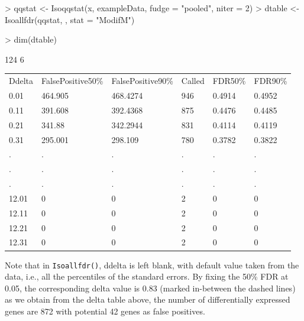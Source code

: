 \documentclass[10pt]{mybook4}
\begin{document}
\begin{Schunk}
\begin{Sinput}
> qqstat <- Isoqqstat(x, exampleData, fudge = "pooled", niter = 2)
> dtable <- Isoallfdr(qqstat, , stat = "ModifM")
\end{Sinput}
\end{Schunk}

\begin{Schunk}
\begin{Sinput}
> dim(dtable)
\end{Sinput}
\begin{Soutput}
[1] 124   6
\end{Soutput}
\end{Schunk}
\begin{table}[!h]
\begin{left}
\begin{tabular}{llllll}
 Ddelta & FalsePositive50\% & FalsePositive90\% & Called & FDR50\% & FDR90\% \\
 0.01 & 464.905 & 468.4274 & 946 & 0.4914 & 0.4952 \\
  0.11 & 391.608 & 392.4368 & 875 & 0.4476 & 0.4485 \\
  0.21 & 341.88 & 342.2944 & 831 & 0.4114 & 0.4119 \\
  0.31 & 295.001 & 298.109 & 780 & 0.3782 & 0.3822 \\
  . & . & . & . & . & . \\
  . & . & . & . & . & . \\
  . & . & . & . & . & . \\
  12.01 & 0 & 0 & 2 & 0 & 0 \\
  12.11 & 0 & 0 & 2 & 0 & 0 \\
  12.21 & 0 & 0 & 2 & 0 & 0 \\
  12.31 & 0 & 0 & 2 & 0 & 0 \\
  \end{tabular}
\end{left}
\end{table}

Note that in \texttt{Isoallfdr()}, ddelta is left blank, with default value taken
from the data, i.e., all the percentiles of the standard errors.
By fixing the 50\% FDR at 0.05, the corresponding delta value is 0.83
(marked in-between the dashed lines) as we obtain from the delta table above,
the number of differentially expressed genes are 872 with potential 42 genes as false positives.
\end{document}
